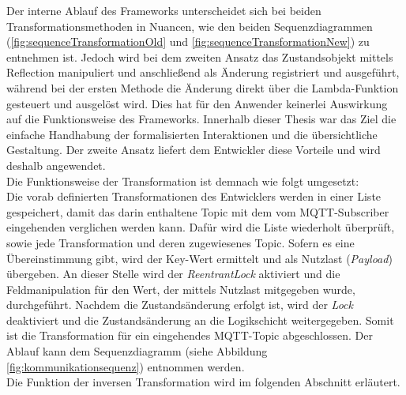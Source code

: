     Der interne Ablauf des Frameworks unterscheidet sich bei beiden Transformationsmethoden in Nuancen, wie den beiden Sequenzdiagrammen 
    (\ref{fig:sequenceTransformationOld} und \ref{fig:sequenceTransformationNew}) zu entnehmen ist. Jedoch wird bei dem zweiten Ansatz 
    das Zustandsobjekt mittels Reflection manipuliert und anschließend als Änderung registriert und ausgeführt, während bei der ersten Methode 
    die Änderung direkt über die Lambda-Funktion gesteuert und ausgelöst wird. Dies hat für den Anwender keinerlei Auswirkung auf die 
    Funktionsweise des Frameworks. Innerhalb dieser Thesis war das Ziel die einfache Handhabung der formalisierten Interaktionen und 
    die übersichtliche Gestaltung. Der zweite Ansatz liefert dem Entwickler diese Vorteile und wird deshalb angewendet. 
    \\
    \linebreak
    Die Funktionsweise der Transformation ist demnach wie folgt umgesetzt:
    \\
    Die vorab definierten Transformationen des Entwicklers werden in einer Liste gespeichert, damit das darin enthaltene Topic mit dem vom \acs{MQTT}-Subscriber eingehenden 
    verglichen werden kann. Dafür wird die Liste wiederholt überprüft, sowie jede Transformation und deren zugewiesenes Topic. Sofern 
    es eine Übereinstimmung gibt, wird der Key-Wert ermittelt und als Nutzlast (\textit{Payload}) übergeben. An dieser Stelle wird der \textit{ReentrantLock} aktiviert 
    und die Feldmanipulation für den Wert, der mittels Nutzlast mitgegeben wurde, durchgeführt. Nachdem die Zustandsänderung erfolgt ist, wird der \textit{Lock} deaktiviert und 
    die Zustandsänderung an die Logikschicht weitergegeben. Somit ist die Transformation für ein eingehendes \acs{MQTT}-Topic abgeschlossen. 
    Der Ablauf kann dem Sequenzdiagramm (siehe Abbildung \ref{fig:kommunikationsequenz}) entnommen werden.  
    \\
    Die Funktion der inversen Transformation wird im folgenden Abschnitt erläutert.

